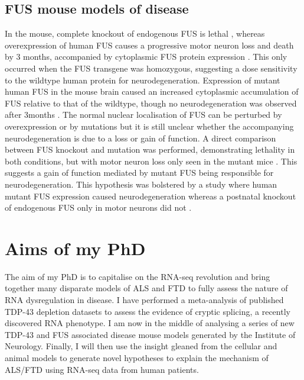 \subsection{ FUS mouse models of disease } 

In the mouse, complete knockout of endogenous FUS is lethal \citep{Hicks2000}, whereas overexpression of human FUS causes a progressive motor neuron loss and death by 3 months, accompanied by cytoplasmic FUS protein expression \citep{Mitchell2013}. This only occurred when the FUS transgene was homozygous, suggesting a dose sensitivity to the wildtype human protein for neurodegeneration. Expression of mutant human FUS in the mouse brain caused an increased cytoplasmic accumulation of FUS relative to that of the wildtype, though no neurodegeneration was observed after 3months \citep{Verbeeck2012}. 
The normal nuclear localisation of FUS can be perturbed by overexpression or by mutations but it is still unclear whether the accompanying neurodegeneration is due to a loss or gain of function. A direct comparison between FUS knockout and mutation was performed, demonstrating lethality in both conditions, but with motor neuron loss only seen in the mutant mice \citep{Scekic-zahirovic2016}. This suggests a gain of function mediated by mutant FUS being responsible for neurodegeneration. This hypothesis was bolstered by a study where human mutant FUS expression caused neurodegeneration whereas a postnatal knockout of endogenous FUS only in motor neurons did not \citep{Sharma2016}. 




\section{Aims of my PhD} %

The aim of my PhD is to capitalise on the RNA-seq revolution and bring together many disparate models of ALS and FTD to fully assess the nature of RNA dysregulation in disease.
I have performed a meta-analysis of published TDP-43 depletion datasets to assess the evidence of cryptic splicing, a recently discovered RNA phenotype. I am now in the middle of analysing a series of new TDP-43 and FUS associated disease mouse models generated by the Institute of Neurology. Finally, I will then use the insight gleaned from the cellular and animal models to generate novel hypotheses to explain the mechanism of ALS/FTD using RNA-seq data from human patients.

%
%
%
%	
